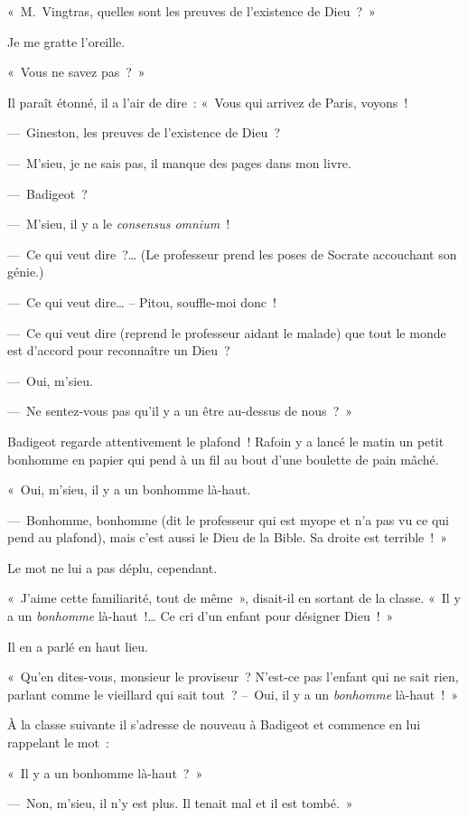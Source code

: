 \documentclass[french,twoside]{book} %
\begin{document}
\noindent « M. Vingtras, quelles sont les preuves de l’existence de Dieu ? »\par
Je me gratte l’oreille.\par
« Vous ne savez pas ? »\par
Il paraît étonné, il a l’air de dire : « Vous qui arrivez de Paris, voyons !\par
— Gineston, les preuves de l’existence de Dieu ?\par
— M’sieu, je ne sais pas, il manque des pages dans mon livre.\par
— Badigeot ?\par
— M’sieu, il y a le \emph{consensus omnium} !\par
— Ce qui veut dire ?… (Le professeur prend les poses de Socrate accouchant son génie.)\par
— Ce qui veut dire… – Pitou, souffle-moi donc !\par
— Ce qui veut dire (reprend le professeur aidant le malade) que tout le monde est d’accord pour reconnaître un Dieu ?\par
— Oui, m’sieu.\par
— Ne sentez-vous pas qu’il y a un être au-dessus de nous ? »\par
Badigeot regarde attentivement le plafond ! Rafoin y a lancé le matin un petit bonhomme en papier qui pend à un fil au bout d’une boulette de pain mâché.\par
« Oui, m’sieu, il y a un bonhomme là-haut.\par
— Bonhomme, bonhomme (dit le professeur qui est myope et n’a pas vu ce qui pend au plafond), mais c’est aussi le Dieu de la Bible. Sa droite est terrible ! »\par
Le mot ne lui a pas déplu, cependant.\par
« J’aime cette familiarité, tout de même », disait-il en sortant de la classe. « Il y a un\emph{ bonhomme} là-haut !… Ce cri d’un enfant pour désigner Dieu ! »\par
Il en a parlé en haut lieu.\par
« Qu’en dites-vous, monsieur le proviseur ? N’est-ce pas l’enfant qui ne sait rien, parlant comme le vieillard qui sait tout ? – Oui, il y a un \emph{bonhomme} là-haut ! »\par
\bigbreak
\noindent À la classe suivante il s’adresse de nouveau à Badigeot et commence en lui rappelant le mot :\par
« Il y a un bonhomme là-haut ? »\par
— Non, m’sieu, il n’y est plus. Il tenait mal et il est tombé. »\par
\end{document}
